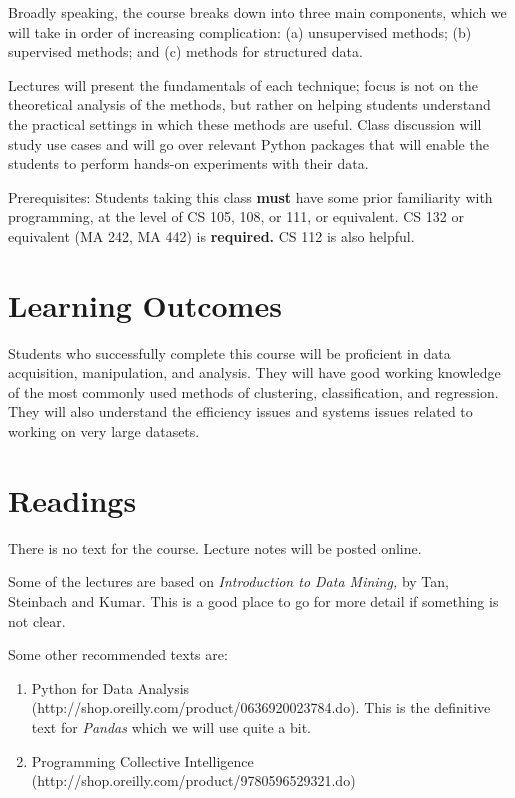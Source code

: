 \documentclass[11pt]{article}
\begin{document}
Broadly speaking, the course breaks down into three main components,
which we will take in order of increasing complication:  (a)
unsupervised methods; (b) supervised methods; and (c) methods for
structured data.

Lectures will present the fundamentals of each technique; focus is not
on the theoretical analysis of the methods, but rather on helping
students understand the practical settings in which these methods are
useful.  Class discussion will study use cases and will go over relevant
Python packages that will enable the students to perform hands-on
experiments with their data. 

Prerequisites: Students taking this class \textbf{must} have some prior familiarity with
programming, at the level of CS 105, 108, or 111, or equivalent.   CS
132 or equivalent (MA 242, MA 442) is \textbf{required.}  CS 112 is also helpful.

\section*{Learning Outcomes}

Students who successfully complete this course will be proficient in
data acquisition, manipulation, and analysis.   They will have good
working knowledge of the most commonly used methods of clustering,
classification, and regression.   They will also understand the
efficiency issues and systems issues related to working on very large
datasets. 

\section*{Readings} 

There is no text for the course.   Lecture notes will be posted online.

Some of the lectures are based on \emph{Introduction to Data Mining,} by
Tan, Steinbach and Kumar.  This is a good place to go for more detail if
something is not clear.

Some other recommended texts are:
\begin{enumerate}
\item Python for Data Analysis
  (http://shop.oreilly.com/product/0636920023784.do).  This is the
  definitive text for \emph{Pandas} which we will use quite a bit.
\item Programming Collective Intelligence (http://shop.oreilly.com/product/9780596529321.do)
\end{enumerate}
\end{document}
